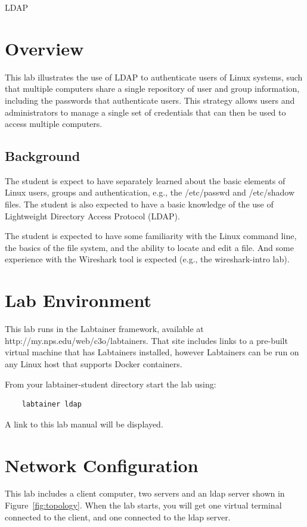 


\begin{center}
{\LARGE LDAP}
\vspace{0.1in}\\
\end{center}

\copyrightnotice

\section{Overview}
This lab illustrates the use of LDAP to authenticate users of Linux systems,
such that multiple computers share a single repository of user and group information, including
the passwords that authenticate users.  This strategy allows users and administrators
to manage a single set of credentials that can then be used to access multiple computers. 

\subsection {Background}
The student is expect to have separately learned about the basic elements of Linux
users, groups and authentication, e.g., the /etc/passwd and /etc/shadow files.  
The student is also expected to have a basic knowledge of the use of Lightweight Directory
Access Protocol (LDAP).

The student is expected to have some familiarity with the Linux command line,
the basics of the file system, and the ability to locate and edit a file.  And some
experience with the Wireshark tool is expected (e.g., the wireshark-intro lab).

\section{Lab Environment}
This lab runs in the Labtainer framework,
available at http://my.nps.edu/web/c3o/labtainers.
That site includes links to a pre-built virtual machine
that has Labtainers installed, however Labtainers can
be run on any Linux host that supports Docker containers.

From your labtainer-student directory start the lab using:
\begin{verbatim}
    labtainer ldap
\end{verbatim}
\noindent A link to this lab manual will be displayed.  


\section{Network Configuration}
This lab includes a client computer, two servers and
an ldap server shown in Figure~\ref{fig:topology}.
When the lab starts, you will get one virtual terminal connected 
to the client, and one connected to the ldap server.

